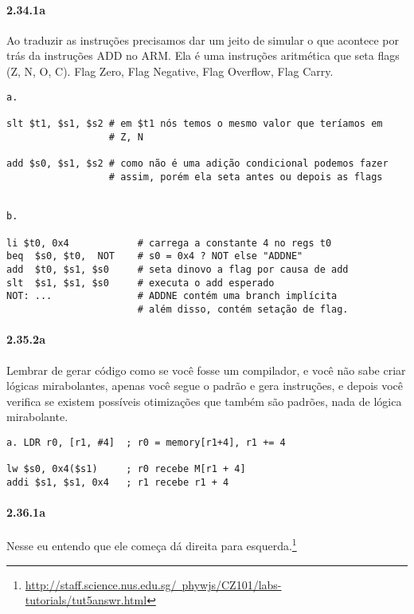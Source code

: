 \documentclass{article}
\begin{document}
\paragraph{2.34.1a}
Ao traduzir as instruções precisamos dar um jeito de simular o que acontece por 
trás da instruções ADD no ARM. Ela é uma instruções aritmética que seta flags 
(Z, N, O, C). Flag Zero, Flag Negative, Flag Overflow, Flag Carry.

\begin{verbatim}
a.

slt $t1, $s1, $s2 # em $t1 nós temos o mesmo valor que teríamos em
                  # Z, N

add $s0, $s1, $s2 # como não é uma adição condicional podemos fazer
                  # assim, porém ela seta antes ou depois as flags


b.

li $t0, 0x4            # carrega a constante 4 no regs t0
beq  $s0, $t0,  NOT    # s0 = 0x4 ? NOT else "ADDNE"
add  $t0, $s1, $s0     # seta dinovo a flag por causa de add
slt  $s1, $s1, $s0     # executa o add esperado
NOT: ...               # ADDNE contém uma branch implícita
                       # além disso, contém setação de flag.
\end{verbatim}

\paragraph{2.35.2a}

Lembrar de gerar código como se você fosse um compilador, e você não sabe criar 
lógicas mirabolantes, apenas você segue o padrão e gera instruções, e depois 
você verifica se existem possíveis otimizações que também são padrões, nada de 
lógica mirabolante.

\begin{verbatim}
a. LDR r0, [r1, #4]  ; r0 = memory[r1+4], r1 += 4

lw $s0, 0x4($s1)     ; r0 recebe M[r1 + 4]
addi $s1, $s1, 0x4   ; r1 recebe r1 + 4
\end{verbatim}

\paragraph{2.36.1a}

Nesse eu entendo que ele começa dá direita para 
esquerda.\footnote{\href{http://staff.science.nus.edu.sg/~phywjs/CZ101/labs-tutorials/tut5answr.html}
{http://staff.science.nus.edu.sg/~phywjs/CZ101/labs-tutorials/tut5answr.html}}
\end{document}
